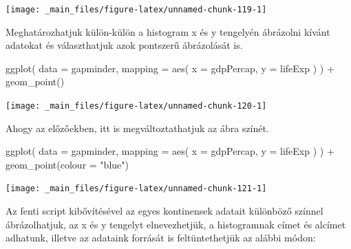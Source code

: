 \documentclass[
]{book}
\newenvironment{Shaded}{\begin{snugshade}}{\end{snugshade}}
\newcommand{\AttributeTok}[1]{\textcolor[rgb]{0.77,0.63,0.00}{#1}}
\newcommand{\FunctionTok}[1]{\textcolor[rgb]{0.00,0.00,0.00}{#1}}
\newcommand{\NormalTok}[1]{#1}
\newcommand{\SpecialCharTok}[1]{\textcolor[rgb]{0.00,0.00,0.00}{#1}}
\newcommand{\StringTok}[1]{\textcolor[rgb]{0.31,0.60,0.02}{#1}}
\begin{document}
\begin{center}\texttt{[image: \_main\_files/figure-latex/unnamed-chunk-119-1]} \end{center}

Meghatározhatjuk külön-külön a histogram x és y tengelyén ábrázolni
kívánt adatokat és választhatjuk azok pontszerű ábrázolását is.

\begin{Shaded}
\begin{Highlighting}[]
\FunctionTok{ggplot}\NormalTok{(}
  \AttributeTok{data =}\NormalTok{ gapminder,}
  \AttributeTok{mapping =} \FunctionTok{aes}\NormalTok{(}
    \AttributeTok{x =}\NormalTok{ gdpPercap,}
    \AttributeTok{y =}\NormalTok{ lifeExp}
\NormalTok{  )}
\NormalTok{) }\SpecialCharTok{+}
  \FunctionTok{geom\_point}\NormalTok{()}
\end{Highlighting}
\end{Shaded}

\begin{center}\texttt{[image: \_main\_files/figure-latex/unnamed-chunk-120-1]} \end{center}

Ahogy az előzőekben, itt is megváltoztathatjuk az ábra színét.

\begin{Shaded}
\begin{Highlighting}[]
\FunctionTok{ggplot}\NormalTok{(}
  \AttributeTok{data =}\NormalTok{ gapminder,}
  \AttributeTok{mapping =} \FunctionTok{aes}\NormalTok{(}
    \AttributeTok{x =}\NormalTok{ gdpPercap,}
    \AttributeTok{y =}\NormalTok{ lifeExp}
\NormalTok{  )}
\NormalTok{) }\SpecialCharTok{+}
  \FunctionTok{geom\_point}\NormalTok{(}\AttributeTok{colour =} \StringTok{"blue"}\NormalTok{)}
\end{Highlighting}
\end{Shaded}

\begin{center}\texttt{[image: \_main\_files/figure-latex/unnamed-chunk-121-1]} \end{center}

Az fenti script kibővítésével az egyes kontinensek adatait különböző
színnel ábrázolhatjuk, az x és y tengelyt elnevezhetjük, a histogramnak
címet és alcímet adhatunk, illetve az adataink forrását is
feltüntethetjük az alábbi módon:
\end{document}
